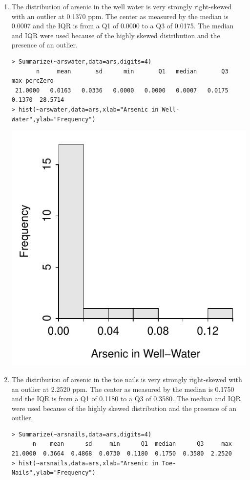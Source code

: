 \documentclass[10pt,openany]{book}\usepackage[]{graphicx}\usepackage[]{color}
\makeatletter
\newenvironment{kframe}{%
 \def\at@end@of@kframe{}%
 \ifinner\ifhmode%
  \def\at@end@of@kframe{\end{minipage}}%
  \begin{minipage}{\columnwidth}%
 \fi\fi%
 \def\FrameCommand##1{\hskip\@totalleftmargin \hskip-\fboxsep
 \colorbox{shadecolor}{##1}\hskip-\fboxsep
     \hskip-\linewidth \hskip-\@totalleftmargin \hskip\columnwidth}%
 \MakeFramed {\advance\hsize-\width
   \@totalleftmargin\z@ \linewidth\hsize
   \@setminipage}}%
 {\par\unskip\endMakeFramed%
 \at@end@of@kframe}
\newenvironment{knitrout}{}{} %
\makeatother
\begin{document}
\begin{itemize}
    \begin{enumerate}
      \item The distribution of arsenic in the well water is very strongly right-skewed with an outlier at 0.1370 ppm.  The center as measured by the median is 0.0007 and the IQR is from a Q1 of 0.0000 to a Q3 of 0.0175.  The median and IQR were used because of the highly skewed distribution and the presence of an outlier.
\begin{knitrout}
\color{fgcolor}\begin{kframe}
\begin{verbatim}
> Summarize(~arswater,data=ars,digits=4)
       n     mean       sd      min       Q1   median       Q3      max percZero 
 21.0000   0.0163   0.0336   0.0000   0.0000   0.0007   0.0175   0.1370  28.5714 
> hist(~arswater,data=ars,xlab="Arsenic in Well-Water",ylab="Frequency")
\end{verbatim}
\end{kframe}

{\centering \includegraphics[width=.4\linewidth]{Figs/ArsHist1-1} 

}



\end{knitrout}


      \item The distribution of arsenic in the toe nails is very strongly right-skewed with an outlier at 2.2520 ppm.  The center as measured by the median is 0.1750 and the IQR is from a Q1 of 0.1180 to a Q3 of 0.3580.  The median and IQR were used because of the highly skewed distribution and the presence of an outlier.
\begin{knitrout}
\color{fgcolor}\begin{kframe}
\begin{verbatim}
> Summarize(~arsnails,data=ars,digits=4)
      n    mean      sd     min      Q1  median      Q3     max 
21.0000  0.3664  0.4868  0.0730  0.1180  0.1750  0.3580  2.2520 
> hist(~arsnails,data=ars,xlab="Arsenic in Toe-Nails",ylab="Frequency")
\end{verbatim}
\end{kframe}


\end{knitrout}
\end{enumerate}
\end{itemize}
\end{document}
